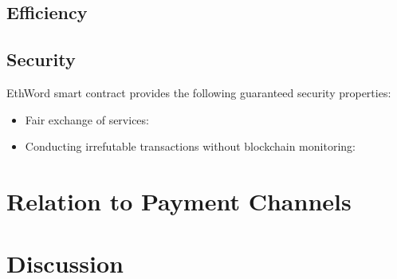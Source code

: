 \subsection{Efficiency}

\subsection{Security}

EthWord smart contract provides the following guaranteed security properties:
\begin{itemize}
	\item Fair exchange of services:
	\item Conducting irrefutable transactions without blockchain monitoring:
\end{itemize}


\section{Relation to Payment Channels}


\section{Discussion}


















